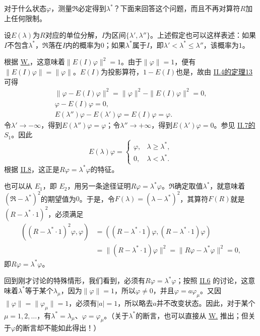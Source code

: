 \documentclass[fontsize=13pt,twoside,openany,headings=normal,parskip=false,bookmarkpackage=false,DIV=calc]{scrbook}
\begin{document}
对于什么状态$\varphi$，测量$\mathfrak R$必定得到$\lambda^*$？下面来回答这个问题，而且不再对算符$R$加上任何限制。

设$E(\lambda)$为$R$对应的单位分解，$I$为区间$\{\lambda',\allowbreak \lambda''\}$。上述假定也可以这样表述：如果$I$不包含$\lambda^*$，$\mathfrak R$落在$I$内的概率为$0$；如果$\lambda^*$属于$I$，即$\lambda'<\lambda^*\le\lambda''$，该概率为$1$。

根据 \hyperref[post:III.1.W]{W.}，这意味着$\|E(I)\varphi\|^2=1$。由于$\|\varphi\|=1$，便有$\|E(I)\varphi\|=\|\varphi\|$。$E(I)$为投影算符，$1-E(I)$也是，故由 \hyperref[thm:II.13]{II.4的定理13} 可得
\begin{gather*}
\|\varphi-E(I)\varphi\|^2=\|\varphi\|^2-\|E(I)\varphi\|^2=0,\\
\varphi-E(I)\varphi=0,\\
E(\lambda'')\varphi-E(\lambda')\varphi=E(I)\varphi=\varphi.
\end{gather*}
令$\lambda'\to-\infty$，得到$E(\lambda'')\varphi=\varphi$；令$\lambda''\to+\infty$，得到$E(\lambda')\varphi=0$。\hypertarget{origpage-113}{}\label{origpage-113}参见 \hyperref[sec:II.7]{II.7的$S_1$}。因此
\[
E(\lambda)\varphi=\begin{cases}\varphi,&\lambda\ge\lambda^*,\\0,&\lambda<\lambda^*.\end{cases}
\]
根据 \hyperref[sec:II.8]{II.8}，这正是$R\varphi=\lambda^*\varphi$的特征。

也可以从 \hyperref[post:III.1.E1]{$E_1$}，即 \hyperref[post:III.1.E2]{$E_2$}，用另一条途径证明$R\varphi=\lambda^*\varphi$。$\mathfrak R$确定取值$\lambda^*$，就意味着$(\mathfrak R-\lambda^*)^2$的期望值为$0$。于是，令$F(\lambda)=(\lambda-\lambda^*)^2$，其算符$F(R)$就是$(R-\lambda^*\cdot1)^2$，必须满足
\begin{align*}
((R-\lambda^*\cdot1)^2\varphi,\varphi)
&=((R-\lambda^*\cdot1)\varphi,(R-\lambda^*\cdot1)\varphi)\\
&=\|(R-\lambda^*\cdot1)\varphi\|^2
=\|R\varphi-\lambda^*\varphi\|^2=0,
\end{align*}
即$R\varphi=\lambda^*\varphi$。

回到刚才讨论的特殊情形，我们看到，必须有$R\varphi=\lambda^*\varphi$；按照 \hyperref[sec:II.6]{II.6} 的讨论，这意味着$\lambda^*$等于某个$\lambda_\mu$，因为$\|\varphi\|=1$，所以$\varphi\ne0$，并且$\varphi=a\varphi_\mu$。又因$\|\varphi\|=\|\varphi_\mu\|=1$，必须有$|a|=1$，所以略去$a$并不改变状态。因此，对于某个$\mu=1,\allowbreak 2,\allowbreak \ldots$，有$\lambda^*=\lambda_\mu$、$\varphi=\varphi_\mu$。（关于$\lambda^*$的断言，也可以直接从 \hyperref[post:III.1.W]{W.} 推出；但关于$\varphi$的断言却不能如此得出！）
\end{document}
